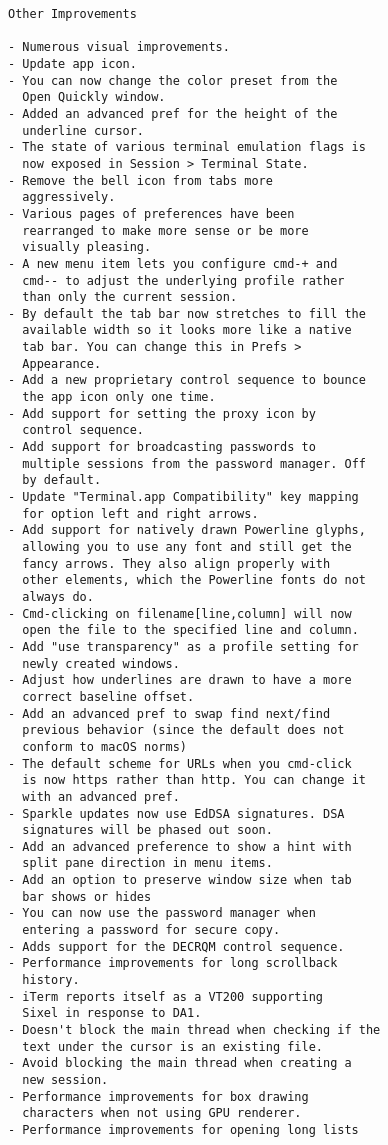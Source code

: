 \begin{verbatim}
Other Improvements

- Numerous visual improvements.
- Update app icon.
- You can now change the color preset from the
  Open Quickly window.
- Added an advanced pref for the height of the
  underline cursor.
- The state of various terminal emulation flags is
  now exposed in Session > Terminal State.
- Remove the bell icon from tabs more
  aggressively.
- Various pages of preferences have been
  rearranged to make more sense or be more
  visually pleasing.
- A new menu item lets you configure cmd-+ and
  cmd-- to adjust the underlying profile rather
  than only the current session.
- By default the tab bar now stretches to fill the
  available width so it looks more like a native
  tab bar. You can change this in Prefs >
  Appearance.
- Add a new proprietary control sequence to bounce
  the app icon only one time.
- Add support for setting the proxy icon by
  control sequence.
- Add support for broadcasting passwords to
  multiple sessions from the password manager. Off
  by default.
- Update "Terminal.app Compatibility" key mapping
  for option left and right arrows.
- Add support for natively drawn Powerline glyphs,
  allowing you to use any font and still get the
  fancy arrows. They also align properly with
  other elements, which the Powerline fonts do not
  always do.
- Cmd-clicking on filename[line,column] will now
  open the file to the specified line and column.
- Add "use transparency" as a profile setting for
  newly created windows.
- Adjust how underlines are drawn to have a more
  correct baseline offset.
- Add an advanced pref to swap find next/find
  previous behavior (since the default does not
  conform to macOS norms)
- The default scheme for URLs when you cmd-click
  is now https rather than http. You can change it
  with an advanced pref.
- Sparkle updates now use EdDSA signatures. DSA
  signatures will be phased out soon.
- Add an advanced preference to show a hint with
  split pane direction in menu items.
- Add an option to preserve window size when tab
  bar shows or hides
- You can now use the password manager when
  entering a password for secure copy.
- Adds support for the DECRQM control sequence.
- Performance improvements for long scrollback
  history.
- iTerm reports itself as a VT200 supporting
  Sixel in response to DA1.
- Doesn't block the main thread when checking if the
  text under the cursor is an existing file.
- Avoid blocking the main thread when creating a
  new session.
- Performance improvements for box drawing
  characters when not using GPU renderer.
- Performance improvements for opening long lists

\end{verbatim}

